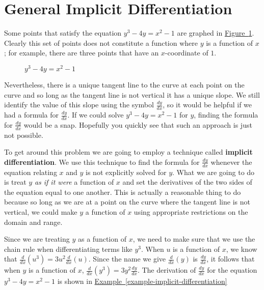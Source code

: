 \documentclass[12pt,]{book}
\newcommand{\terminology}[1]{\textbf{#1}}
\theoremstyle{plain}
\theoremstyle{definition}
\numberwithin{equation}{section}
\newcommand{\lz}[2]{\frac{d#1}{d#2}}
\newcommand{\lzoo}[2]{{\frac{d}{d#1}}{\left(#2\right)}}
\begin{document}
\section[General Implicit Differentiation]{General Implicit Differentiation}\label{section-general-implicit-differentiation}
Some points that satisfy the equation \(y^3-4y=x^2-1\) are graphed in \hyperref[figure-elliptic-curve]{Figure~\ref*{figure-elliptic-curve}}.  Clearly this set of points does not constitute a function where \(y\) is a function of \(x\); for example, there are three points that have an \(x\)-coordinate of \(1\).%
\begin{figure}
\centering
{
}
\caption{\(y^3-4y=x^2-1\)\label{figure-elliptic-curve}}
\end{figure}
\par
Nevertheless, there is a unique tangent line to the curve at each point on the curve and so long as the tangent line is not vertical it has a unique slope.  We still identify the value of this slope using the symbol \(\lz{y}{x}\), so it would be helpful if we had a formula for \(\lz{y}{x}\).  If we could solve \(y^3-4y=x^2-1\) for \(y\), finding the formula for \(\lz{y}{x}\) would be a snap.  Hopefully you quickly see that such an approach is just not possible.%
\par
To get around this problem we are going to employ a technique called \terminology{implicit differentiation}.  We use this technique to find the formula for \(\lz{y}{x}\) whenever the equation relating \(x\) and \(y\) is not explicitly solved for \(y\).  What we are going to do is treat \(y\) \emph{as if it were} a function of \(x\) and set the derivatives of the two sides of the equation equal to one another.  This is actually a reasonable thing to do because so long as we are at a point on the curve where the tangent line is not vertical, we could make \(y\) a function of \(x\) using appropriate restrictions on the domain and range.%
\par
Since we are treating \(y\) as a function of \(x\), we need to make sure that we use the chain rule when differentiating terms like \(y^3\).  When \(u\) is a function of \(x\), we know that \(\lzoo{x}{u^3}=3u^2\lzoo{x}{u}\). Since the name we give \(\lzoo{x}{y}\) is \(\lz{y}{x}\), it follows that when \(y\) is a function of \(x\), \(\lzoo{x}{y^3}=3y^2\lz{y}{x}\). The derivation of \(\lz{y}{x}\) for the equation \(y^3-4y=x^2-1\) is shown in \hyperref[example-implicit-differentiation]{Example~\ref*{example-implicit-differentiation}}%
\end{document}
